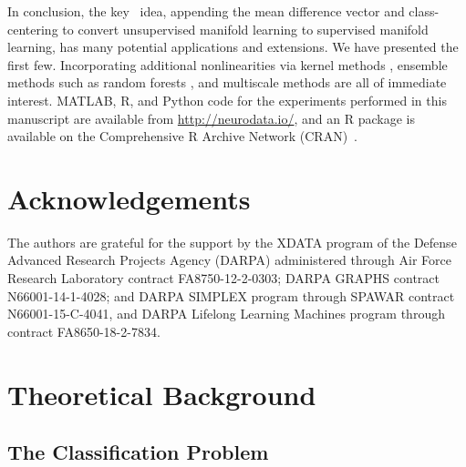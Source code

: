 \documentclass[11pt]{extarticle}
\begin{document}
%
In conclusion, the key \Lol~idea, appending the mean difference vector and class-centering to convert unsupervised manifold learning to supervised manifold learning, has many potential applications and extensions.  We have presented the first few.  Incorporating additional nonlinearities via kernel methods \cite{Mika1999a}, ensemble methods \cite{Cannings2015} such as random forests \cite{Breiman2001a}, and multiscale methods \cite{Allard2012}
are all of immediate interest.
MATLAB,  R, and Python code for the experiments performed in this manuscript are available from \url{http://neurodata.io/}, and an R package is available on the Comprehensive R Archive Network (CRAN)~\cite{Bridgeford2018-fq}.




\pagestyle{empty}



\section*{Acknowledgements}

The authors are grateful for the support  by the XDATA program of the Defense Advanced Research Projects Agency (DARPA) administered through Air
Force Research Laboratory contract FA8750-12-2-0303;
DARPA GRAPHS contract N66001-14-1-4028; and
DARPA SIMPLEX program through SPAWAR contract N66001-15-C-4041, and DARPA Lifelong Learning Machines program through contract FA8650-18-2-7834.

\clearpage
\appendix







\section{Theoretical Background}
\label{sec:background}

\subsection{The Classification Problem}
\end{document}
